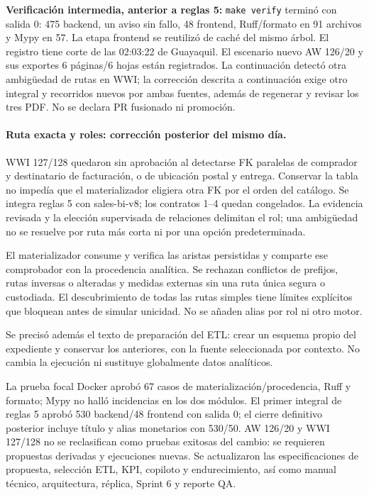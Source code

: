 \documentclass[11pt,letterpaper]{article}
\newcommand{\file}[1]{\texttt{#1}}
\begin{document}
\textbf{Verificación intermedia, anterior a reglas 5:} \file{make verify} terminó con salida 0:
475 backend, un aviso sin fallo, 48 frontend, Ruff/formato en 91 archivos y Mypy
en 57. La etapa frontend se reutilizó de caché del mismo árbol. El registro
 tiene corte de las 02:03:22 de Guayaquil.
El escenario nuevo AW 126/20 y sus exportes 6 páginas/6 hojas están registrados.
La continuación detectó otra ambigüedad de rutas en WWI; la corrección descrita
a continuación exige otro integral y recorridos nuevos por ambas fuentes, además
de regenerar y revisar los tres PDF. No se declara PR fusionado ni promoción.

\paragraph{Ruta exacta y roles: corrección posterior del mismo día.}
WWI 127/128 quedaron sin aprobación al detectarse FK paralelas de comprador y
destinatario de facturación, o de ubicación postal y entrega. Conservar la tabla
no impedía que el materializador eligiera otra FK por el orden del catálogo.
Se integra reglas 5 con sales-bi-v8; los contratos 1--4 quedan congelados.
La evidencia revisada y la elección supervisada de relaciones delimitan el rol;
una ambigüedad no se resuelve por ruta más corta ni por una opción predeterminada.

El materializador consume y verifica las aristas persistidas y comparte ese
comprobador con la procedencia analítica. Se rechazan conflictos de prefijos,
rutas inversas o alteradas y medidas externas sin una ruta única segura o
custodiada. El descubrimiento de todas las rutas simples tiene límites explícitos
que bloquean antes de simular unicidad. No se añaden alias por rol ni otro motor.

Se precisó además el texto de preparación del ETL: crear un esquema propio del
expediente y conservar los anteriores, con la fuente seleccionada por contexto.
No cambia la ejecución ni sustituye globalmente datos analíticos.

La prueba focal Docker aprobó 67 casos de materialización/procedencia, Ruff y
formato; Mypy no halló incidencias en los dos módulos. El primer integral de reglas 5 aprobó 530 backend/48 frontend con salida 0;
el cierre definitivo posterior incluye título y alias monetarios con 530/50. AW 126/20 y WWI 127/128 no se reclasifican como pruebas exitosas
del cambio: se requieren propuestas derivadas y ejecuciones nuevas. Se actualizaron
las especificaciones de propuesta, selección ETL, KPI, copiloto y endurecimiento,
así como manual técnico, arquitectura, réplica, Sprint 6 y reporte QA.
\end{document}
